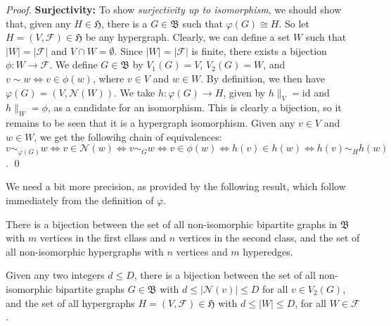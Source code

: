 \begin{proof}
\textbf{Surjectivity:}
To show \emph{surjectivity up to isomorphism}, we should show that, given any $H \in \mathfrak{H}$, there is a $G \in \mathfrak{B}$ such that $\varphi(G) \cong H$.
So let $H = (V, \mathcal{F}) \in \mathfrak{H}$ be any hypergraph.
Clearly, we can define a set $W$ such that $| W | = | \mathcal{F} |$ and $V \cap W = \emptyset$.
Since $| W | = | \mathcal{F} |$ is finite, there exists a bijection $\phi: W \rightarrow \mathcal{F}$.
We define $G \in \mathfrak{B}$ by $V_1(G) = V$, $V_2(G) = W$, and $v \sim w \Leftrightarrow v \in \phi(w)$, where $v \in V$ and $w \in W$.
By definition, we then have $\varphi(G) = (V, \mathcal{N}(W))$.
We take $h: \varphi(G) \rightarrow H$, given by $h \|_{V} = \text{id}$ and $h\|_{W} = \phi$, as a candidate for an isomorphism.
This is clearly a bijection, so it remains to be seen that it is a hypergraph isomorphism.
Given any $v \in V$ and $w \in W$, we get the followihg chain of equivalences:
$v \sim_{\varphi(G)} w \Leftrightarrow v \in \mathcal{N}(w) \Leftrightarrow v \sim_G w \Leftrightarrow v \in \phi(w) \Leftrightarrow h(v) \in h(w) \Leftrightarrow h(v) \sim_H h(w)$.
\qed
\end{proof}

We need a bit more precision, as provided by the following result, which follow immediately from the definition of $\varphi$.

\begin{corollary}
There is a bijection between the set of all non-isomorphic bipartite graphs in $\mathfrak{B}$ with $m$ vertices in the first cllass and $n$ vertices in the second class, and the set of all non-isomorphic hypergraphs with $n$ vertices and $m$ hyperedges.
\end{corollary}

\begin{corollary}
Given any two integers $d \leq D$, there is a bijection between the set of all non-isomorphic bipartite graphs $G \in \mathfrak{B}$ with $d \leq | \mathcal{N}(v) | \leq D$ for all $v \in V_2(G)$, and the set of all hypergraphs $H = (V, \mathcal{F}) \in \mathfrak{H}$ with $d \leq | W | \leq D$, for all $W \in \mathcal{F}$.
\end{corollary}
